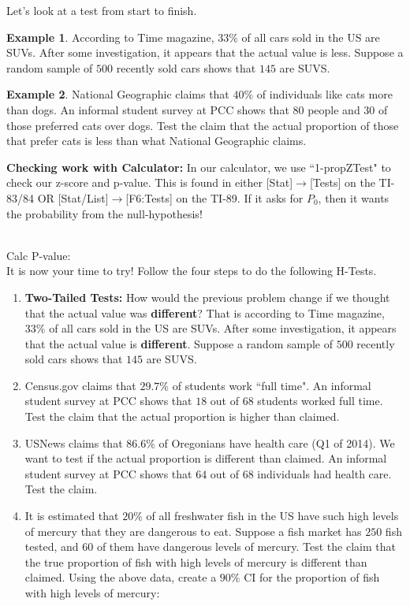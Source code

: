 \documentclass[12pt]{amsart}
\theoremstyle{definition}
\newtheorem{ex}{Example}
\begin{document}
 \newpage
 \noindent Let's look at a test from start to finish. 
 \begin{ex} According to Time magazine, $33\%$ of all cars sold in the US are SUVs. After some investigation, it appears that the actual value is less. Suppose a random sample of $500$ recently sold cars shows that $145$ are SUVS.\end{ex}
 \vfill
 \newpage
 
 \begin{ex} National Geographic claims that $40\%$ of individuals like cats more than dogs. An informal student survey at PCC shows that $80$ people and $30$ of those preferred cats over dogs. Test the claim that the actual proportion of those that prefer cats is less than what National Geographic claims.\end{ex}
 \vfill
 \begin{framed} \textbf{Checking work with Calculator:} In our calculator, we use ``1-propZTest" to check our z-score and p-value. This is found in either [Stat]$\rightarrow$[Tests] on the TI-83/84 OR [Stat/List]$\rightarrow$[F6:Tests] on the TI-89. If it asks for $P_0$, then it wants the probability from the null-hypothesis!\\\end{framed}
 ~\\
 Calc P-value:~\\
 \newpage
 \noindent It is now your time to try! Follow the four steps to do the following H-Tests.
 \begin{enumerate}
 	\item \textbf{Two-Tailed Tests:} How would the previous problem change if we thought that the actual value was \textbf{different}? That is according to Time magazine, $33\%$ of all cars sold in the US are SUVs. After some investigation, it appears that the actual value is \textbf{different}. Suppose a random sample of $500$ recently sold cars shows that $145$ are SUVS.
 	\vfill
 	\item Census.gov claims that $29.7\%$ of students work ``full time". An informal student survey at PCC shows that $18$ out of $68$ students worked full time. Test the claim that the actual proportion is higher than claimed.
 	\vfill
 	\newpage
 	\item USNews claims that $86.6\%$ of Oregonians have health care (Q1 of 2014). We want to test if the actual proportion is different than claimed. An informal student survey at PCC shows that $64$ out of $68$ individuals had health care. Test the claim.
 	\vfill
 	\item It is estimated that $20\%$ of all freshwater fish in the US have such high levels of mercury that they are dangerous to eat. Suppose a fish market has $250$ fish tested, and $60$ of them have dangerous levels of mercury. Test the claim that the true proportion of fish with high levels of mercury is different than claimed.
 	\vfill
 	Using the above data, create a $90\%$ CI for the proportion of fish with high levels of mercury: \vspace{0.2in}
 \end{enumerate}
\end{document}
